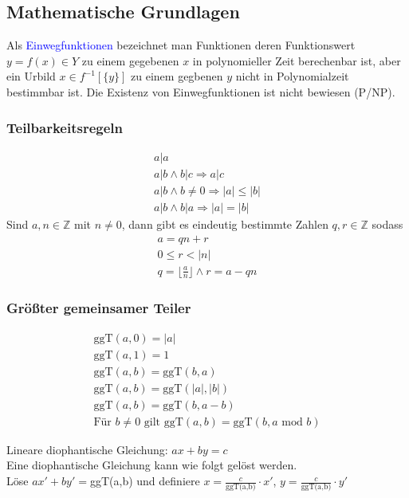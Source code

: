 \documentclass[a4paper,12pt]{article}
\newcommand{\blue}[1]{\textcolor{blue}{#1}}
\begin{document}
\subsection{Mathematische Grundlagen}
\label{def:Einwegfunktion}
Als \blue{Einwegfunktionen} bezeichnet man Funktionen deren Funktionswert $y = f(x)\in Y$ zu einem gegebenen $x$ in polynomieller Zeit berechenbar ist, aber ein Urbild $x\in f^{-1}[\{y\}]$ zu einem gegbenen $y$ nicht in Polynomialzeit bestimmbar ist. Die Existenz von Einwegfunktionen ist nicht bewiesen (P/NP).
\subsubsection{Teilbarkeitsregeln}
\begin{align}
a | a\\
a | b \wedge b |c \Rightarrow a|c\\
a|b\wedge b\neq 0 \Rightarrow |a|\leq |b|\\
a | b\wedge b|a \Rightarrow |a| = |b|
\end{align}
Sind $a,n\in\mathbb{Z}$ mit $n\neq 0$, dann gibt es eindeutig bestimmte Zahlen $q,r\in\mathbb{Z}$ sodass
\begin{align*}
a= qn+r\\
0\leq r < |n|\\
q = \lfloor \frac{a}{n} \rfloor \wedge r = a -qn
\end{align*}
\subsubsection{Größter gemeinsamer Teiler}
\label{sec:euklid}
\begin{align}
\textrm{ggT}(a,0)=|a|\\
\textrm{ggT}(a,1)=1\\
\textrm{ggT}(a,b)=\textrm{ggT}(b,a)\\
\textrm{ggT}(a,b)=\textrm{ggT}(|a|,|b|)\\
\textrm{ggT}(a,b)=\textrm{ggT}(b,a-b)\\
\textrm{Für } b\neq 0 \textrm{ gilt } \textrm{ggT}(a,b)=\textrm{ggT}(b,a \textrm{ mod } b)
\end{align}

Lineare diophantische Gleichung: $ax+by=c$\\
Eine diophantische Gleichung kann wie folgt gelöst werden.\\
Löse $ax'+by'=$ggT(a,b) und definiere $x=\frac{c}{\textrm{ggT(a,b)}}\cdot x'$, $y=\frac{c}{\textrm{ggT(a,b)}}\cdot y'$
\end{document}
